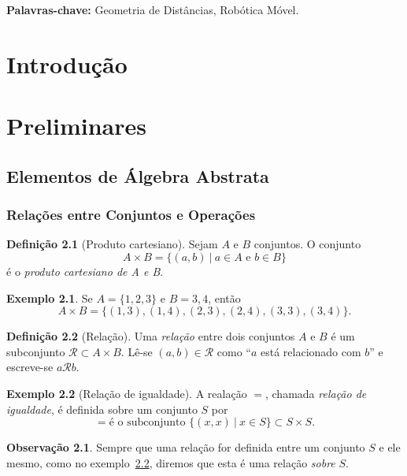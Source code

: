 \documentclass[a4paper,12pt]{report}
\theoremstyle{plain}
\theoremstyle{definition}
\newtheorem{definicao}{Definição}[section]
\newtheorem{observacao}{Observação}[section]
\newtheorem{exemplo}{Exemplo}[section]
\begin{document}
	\textbf{Palavras-chave:} Geometria de Distâncias, Robótica Móvel.
	
	
	\newpage
	\chapter{Introdução}

	\newpage
	
	\chapter{Preliminares}
	
	\section{Elementos de Álgebra Abstrata}
	
	\subsection{Relações entre Conjuntos e Operações}
	
	\begin{definicao}[Produto cartesiano]
		Sejam $A$ e $B$ conjuntos. O conjunto $$A\times B = \{(a,b) \ | \ a\in A \text{ e } b\in B\}$$
		é o \emph{produto cartesiano de A e B}.
	\end{definicao}
	
	\begin{exemplo}
		Se $A = \{1,2,3\}$ e $B = {3,4}$, então $$A\times B = \{(1,3),(1,4),(2,3),(2,4),(3,3),(3,4)\}.$$
	\end{exemplo}
	
	\begin{definicao}[Relação]
		Uma	\emph{relação} entre dois conjuntos $A$ e $B$ é um subconjunto $\mathcal{R}\subset A\times B$. Lê-se $(a,b) \in \mathcal{R}$ como ``$a$ está relacionado com $b$'' e escreve-se $a\mathcal{R}b$.
	\end{definicao}
	
	\begin{exemplo}[Relação de igualdade]\label{ex:igualdade}
		A realação $=$, chamada \emph{relação de igualdade}, é definida sobre um conjunto $S$ por $$= \text{é o subconjunto } \{(x,x) \ |\ x\in S\}\subset S\times S.$$
	\end{exemplo}
	
	\begin{observacao}
		Sempre que uma relação for definida entre um conjunto $S$ e ele mesmo, como no exemplo~\ref{ex:igualdade}, diremos que esta é uma relação \emph{sobre} $S$.
	\end{observacao}
	
\end{document}
